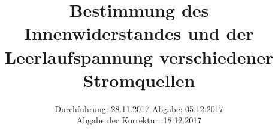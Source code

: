 

\subject{Versuch 301}
\title{Bestimmung des Innenwiderstandes und der Leerlaufspannung verschiedener
       Stromquellen}
\date{
  Durchführung: 28.11.2017
  \hspace{3em}
  Abgabe: 05.12.2017 \\
  Abgabe der Korrektur: 18.12.2017
}


    \maketitle
    \thispagestyle{empty}
    \tableofcontents
    \newpage
    
    
    
    
    
    \printbibliography{}
    \newpage
    

